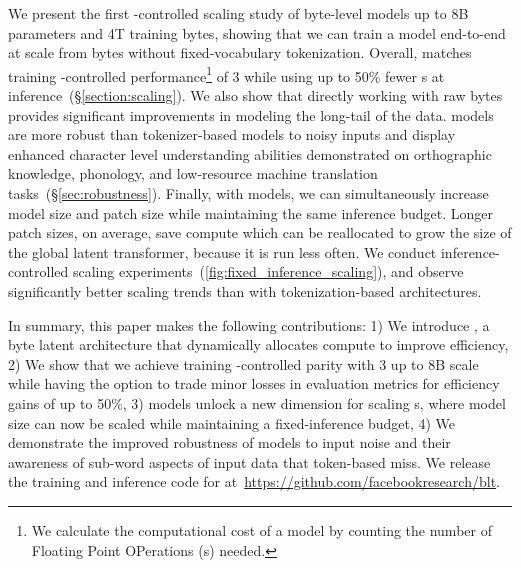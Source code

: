 \documentclass[]{fairmeta}
\begin{document}

We present the first \flop{}-controlled scaling study of byte-level models up to 8B parameters and 4T training bytes, showing that we can train a model end-to-end at scale from bytes without fixed-vocabulary tokenization. 
Overall, \model{} matches training \flop{}-controlled performance\footnote{We calculate the computational cost of a model by counting the number of Floating Point OPerations (\flop{}s) needed.} of \llama{} 3 while using up to 50\% fewer \flop{}s at inference~(\S\ref{section:scaling}).
We also show that directly working with raw bytes provides significant improvements in modeling the long-tail of the data. \model{} models are more robust than tokenizer-based models to noisy inputs and display enhanced character level understanding abilities demonstrated on orthographic knowledge, phonology, and low-resource machine translation tasks~(\S\ref{sec:robustness}).
Finally, with \model{} models, we can simultaneously increase model size and patch size  while maintaining the same inference \flop{} budget. Longer patch sizes, on average, save compute which can be reallocated to grow the size of the global latent transformer, because it is run less often. We conduct inference-\flop{} controlled scaling experiments~(\autoref{fig:fixed_inference_scaling}), and observe significantly better scaling trends than with tokenization-based architectures. 


In summary, this paper makes the following contributions:
1) We introduce \model{}, a byte latent \llm{} architecture that dynamically allocates compute to improve \flop{} efficiency,
2) We show that we achieve training \flop{}-controlled parity with \llama{} 3 up to 8B scale while having the option to trade minor losses in evaluation metrics for \flop{} efficiency gains of up to 50\%, 3) \model{} models unlock a new dimension for scaling \llm{}s, where model size can now be scaled while maintaining a fixed-inference budget, 4) We demonstrate the improved robustness of \model{} models to input noise and their awareness of sub-word aspects of input data that token-based \llms{} miss.
We release the training and inference code for \model{}  at~\url{https://github.com/facebookresearch/blt}.
\end{document}
